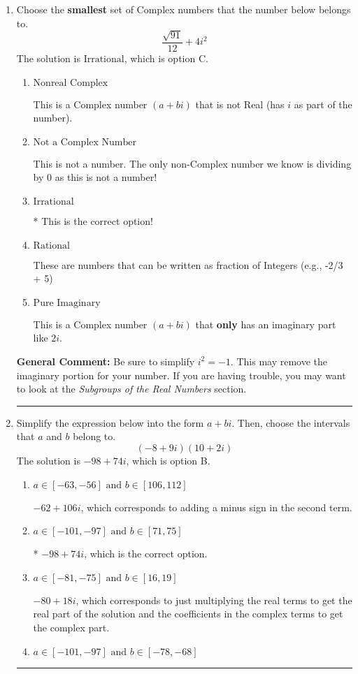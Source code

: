 \documentclass{extbook}[14pt]
\newcommand{\litem}[1]{\item #1

\rule{\textwidth}{0.4pt}}
\begin{document}
\begin{enumerate}\litem{
Choose the \textbf{smallest} set of Complex numbers that the number below belongs to.
\[ \frac{\sqrt{91}}{12}+4i^2 \]The solution is \( \text{Irrational} \), which is option C.\begin{enumerate}[label=\Alph*.]
\item \( \text{Nonreal Complex} \)

This is a Complex number $(a+bi)$ that is not Real (has $i$ as part of the number).
\item \( \text{Not a Complex Number} \)

This is not a number. The only non-Complex number we know is dividing by 0 as this is not a number!
\item \( \text{Irrational} \)

* This is the correct option!
\item \( \text{Rational} \)

These are numbers that can be written as fraction of Integers (e.g., -2/3 + 5)
\item \( \text{Pure Imaginary} \)

This is a Complex number $(a+bi)$ that \textbf{only} has an imaginary part like $2i$.
\end{enumerate}

\textbf{General Comment:} Be sure to simplify $i^2 = -1$. This may remove the imaginary portion for your number. If you are having trouble, you may want to look at the \textit{Subgroups of the Real Numbers} section.
}
\litem{
Simplify the expression below into the form $a+bi$. Then, choose the intervals that $a$ and $b$ belong to.
\[ (-8 + 9 i)(10 + 2 i) \]The solution is \( -98 + 74 i \), which is option B.\begin{enumerate}[label=\Alph*.]
\item \( a \in [-63, -56] \text{ and } b \in [106, 112] \)

 $-62 + 106 i$, which corresponds to adding a minus sign in the second term.
\item \( a \in [-101, -97] \text{ and } b \in [71, 75] \)

* $-98 + 74 i$, which is the correct option.
\item \( a \in [-81, -75] \text{ and } b \in [16, 19] \)

 $-80 + 18 i$, which corresponds to just multiplying the real terms to get the real part of the solution and the coefficients in the complex terms to get the complex part.
\item \( a \in [-101, -97] \text{ and } b \in [-78, -68] \)


\end{enumerate}}
\end{enumerate}
\end{document}
